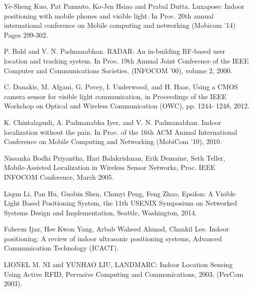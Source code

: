\documentclass[conference]{IEEEtran}
\begin{document}
%
%
%
\begin{thebibliography}{1}

Ye-Sheng Kuo, Pat Pannuto, Ko-Jen Hsiao and Prabal Dutta. Luxapose: Indoor positioning with mobile phones and visible light. In Proc. 20th annual international conference on Mobile computing and networking (Mobicom ’14)
Pages 299-302.

P. Bahl and V. N. Padmanabhan. RADAR: An in-building
RF-based user location and tracking system. In Proc. 19th
Annual Joint Conference of the IEEE Computer and
Communications Societies. (INFOCOM ’00), volume 2, 2000.

C. Danakis, M. Afgani, G. Povey, I. Underwood, and H. Haas, Using a CMOS camera sensor for visible light
communication, in Proceedings of the IEEE Workshop on Optical and Wireless Communication (OWC), pp. 1244-
1248, 2012.

K. Chintalapudi, A. Padmanabha Iyer, and V. N.
Padmanabhan. Indoor localization without the pain. In Proc.
of the 16th ACM Annual International Conference on Mobile
Computing and Networking (MobiCom ’10), 2010.

Nissanka Bodhi Priyantha, Hari Balakrishnan, Erik Demaine, Seth Teller, Mobile-Assisted Localization in Wireless Sensor Networks, Proc. IEEE INFOCOM Conference, March 2005.

Liqun Li, Pan Hu, Guobin Shen, Chunyi Peng, Feng Zhao, Epsilon: A Visible Light Based Positioning System, the 11th USENIX Symposium on Networked Systems Design and Implementation, Seattle, Washington, 2014.

Faheem Ijaz, Hee Kwon Yang, Arbab Waheed Ahmad, Chankil Lee. Indoor positioning: A review of indoor ultrasonic positioning systems, Advanced Communication Technology (ICACT).


LIONEL M. NI and YUNHAO LIU, LANDMARC: Indoor Location Sensing Using Active RFID, Pervasive Computing and Communications, 2003. (PerCom 2003).


\end{thebibliography}
\end{document}
